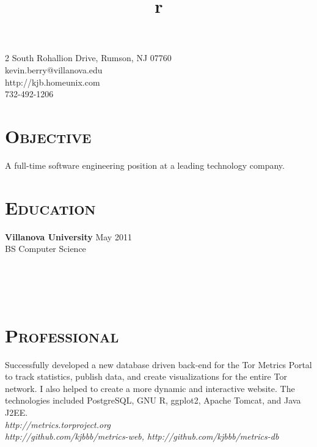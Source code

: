 \begin{resume}
\begin{flushright}
2 South Rohallion Drive, Rumson, NJ 07760 \\
kevin.berry@villanova.edu \\
http://kjb.homeunix.com \\
732-492-1206 \\
\end{flushright}

\section{\textsc{Objective}}
A full-time software engineering position at a leading technology company.
\section{\textsc{Education}}

\textbf{Villanova University} \hfill May 2011 \\
BS Computer Science


\begin{formatb}
  \title{r}\\
  \\
  \body\\
\end{formatb}

\section{\textsc{Professional}}

\title{}
\begin{position}
Successfully developed a new database driven back-end for the Tor Metrics Portal
to track statistics, publish data, and create visualizations for the entire Tor
network.  I also helped to create a more dynamic and interactive website. The
technologies included PostgreSQL, GNU R, ggplot2, Apache Tomcat, and Java J2EE. \\
{\itshape http://metrics.torproject.org} \\ {\itshape
http://github.com/kjbbb/metrics-web, http://github.com/kjbbb/metrics-db}
\end{position}


\end{resume}
